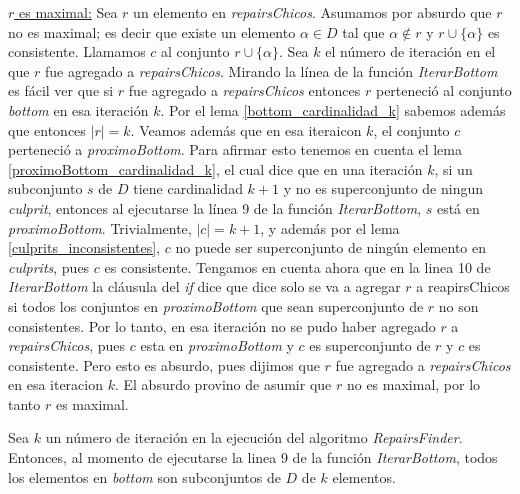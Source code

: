 \documentclass[11pt,a4paper,twoside]{tesis}
\begin{document}
\underline{$r$ es maximal:} Sea $r$ un elemento en \textit{repairsChicos}. Asumamos por absurdo que $r$ no es maximal; es decir que existe un elemento $\alpha \in D$ tal que $\alpha \not\in r$ y $r \cup \{\alpha\}$ es consistente. Llamamos $c$ al conjunto $r \cup \{\alpha\}$. Sea $k$ el número de iteración en el que $r$ fue agregado a \textit{repairsChicos}. Mirando la línea de la función \textit{IterarBottom} es fácil ver que si $r$ fue agregado a \textit{repairsChicos} entonces $r$ perteneció al conjunto \textit{bottom} en esa iteración $k$. Por el lema \ref{bottom_cardinalidad_k} sabemos además que entonces $|r| = k$. Veamos además que en esa iteraicon $k$, el conjunto $c$ perteneció a \textit{proximoBottom}. Para afirmar esto tenemos en cuenta el lema \ref{proximoBottom_cardinalidad_k}, el cual dice que en una iteración $k$, si un subconjunto $s$ de $D$ tiene cardinalidad $k+1$ y no es superconjunto de ningun \textit{culprit}, entonces al ejecutarse la línea 9 de la función \textit{IterarBottom}, $s$ está en \textit{proximoBottom}. Trivialmente, $|c| = k+1$, y además por el lema \ref{culprits_inconsistentes}, $c$ no puede ser superconjunto de ningún elemento en \textit{culprits}, pues $c$ es consistente.
Tengamos en cuenta ahora que en la linea 10 de \textit{IterarBottom} la cláusula del \textit{if} dice que dice solo se va a agregar $r$ a reapirsChicos si todos los conjuntos en \textit{proximoBottom} que sean superconjunto de $r$ no son consistentes. Por lo tanto, en esa iteración no se pudo haber agregado $r$ a \textit{repairsChicos}, pues $c$ esta en \textit{proximoBottom} y $c$ es superconjunto de $r$ y $c$ es consistente. Pero esto es absurdo, pues dijimos que $r$ fue agregado a \textit{repairsChicos} en esa iteracion $k$. El absurdo provino de asumir que $r$ no es maximal, por lo tanto $r$ es maximal.

\begin{lemma}\label{bottom_cardinalidad_k}
Sea $k$ un número de iteración en la ejecución del algoritmo \textit{RepairsFinder}. Entonces, al momento de ejecutarse la linea 9 de la función \textit{IterarBottom}, todos los elementos en \textit{bottom} son subconjuntos de $D$ de $k$ elementos.
\end{lemma}
\end{document}
